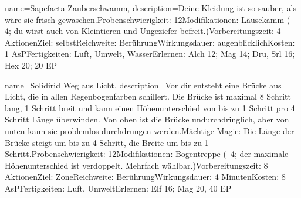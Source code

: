 {
    name={Sapefacta Zauberschwamm},
    description={Deine Kleidung ist so sauber, als wäre sie frisch gewaschen.\newline Probenschwierigkeit: 12\newline Modifikationen: Läusekamm (–4; du wirst auch von Kleintieren und Ungeziefer befreit.)\newline Vorbereitungszeit: 4 Aktionen\newline Ziel: selbst\newline Reichweite: Berührung\newline Wirkungsdauer: augenblicklich\newline Kosten: 1 AsP\newline Fertigkeiten: Luft, Umwelt, Wasser\newline Erlernen: Alch 12; Mag 14; Dru, Srl 16; Hex 20; 20 EP}
}


{
    name={Solidirid Weg aus Licht},
    description={Vor dir entsteht eine Brücke aus Licht, die in allen Regenbogenfarben schillert. Die Brücke ist maximal 8 Schritt lang, 1 Schritt breit und kann einen Höhenunterschied von bis zu 1 Schritt pro 4 Schritt Länge überwinden. Von oben ist die Brücke undurchdringlich, aber von unten kann sie problemlos durchdrungen werden.\newline Mächtige Magie: Die Länge der Brücke steigt um bis zu 4 Schritt, die Breite um bis zu 1 Schritt.\newline Probenschwierigkeit: 12\newline Modifikationen: Bogentreppe (–4; der maximale Höhenunterschied ist verdoppelt. Mehrfach wählbar.)\newline Vorbereitungszeit: 8 Aktionen\newline Ziel: Zone\newline Reichweite: Berührung\newline Wirkungsdauer: 4 Minuten\newline Kosten: 8 AsP\newline Fertigkeiten: Luft, Umwelt\newline Erlernen: Elf 16; Mag 20, 40 EP}
}


